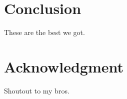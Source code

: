 \documentclass[journal]{IEEEtran}
\begin{document}
\section{Conclusion}

These are the best we got.

 
\section*{Acknowledgment}

Shoutout to my bros.

\ifCLASSOPTIONcaptionsoff
  \newpage
\fi






%
%



% 
\end{document}
